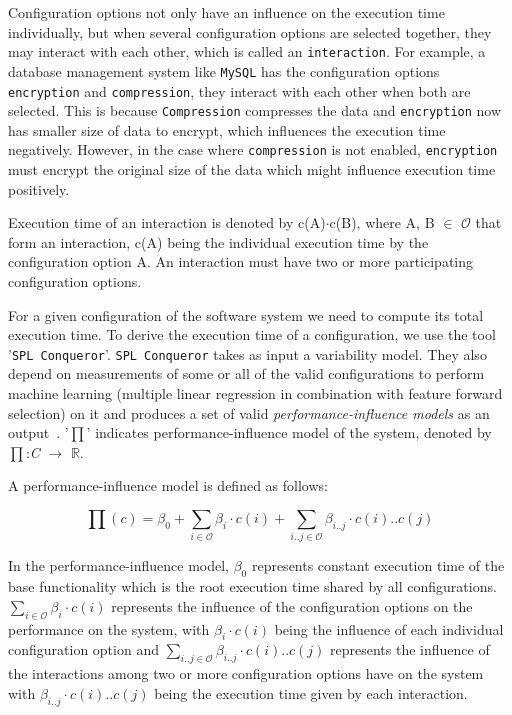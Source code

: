 Configuration options not only have an influence on the execution time individually, but when several configuration options are selected together, they may interact with each other, which is called an \texttt{interaction}. For example, a database management system like \texttt{MySQL} has the configuration options \texttt{encryption} and \texttt{compression}, they interact with each other when both are selected. This is because \texttt{Compression} compresses the data and \texttt{encryption} now has smaller size of data to encrypt, which influences the execution time negatively. However, in the case where \texttt{compression} is not enabled, \texttt{encryption} must encrypt the original size of the data which might influence execution time positively. 

Execution time of an interaction is denoted by c(A)$\cdot$c(B), where A, B $\in$ $\mathcal{O}$ that form an interaction, c(A) being the individual execution time by the configuration option A. An interaction must have two or more participating configuration options.

For a given configuration of the software system we need to compute its total execution time. To derive the execution time of a configuration, we use the tool '\texttt{SPL Conqueror}'. \texttt{SPL Conqueror} takes as input a variability model. They also depend on measurements of some or all of the valid configurations to perform machine learning (multiple linear regression in combination with feature forward selection) on it and produces a set of valid \textit{performance-influence models} as an output~\cite{DBLP:conf/sigsoft/SiegmundGAK15}. '$\mathcal\prod$' indicates performance-influence model of the system, denoted by $\mathcal\prod$:\textit{C} $\rightarrow$ $\mathbb{R}$. 

A performance-influence model is defined as follows:

\begin{equation*}
  \prod {(c)} =  \beta_{\mathrm{0}} + \sum_{i \in \mathcal{O}} \beta_{\textit{i}} \cdot {{c(i)}} + \sum_{i..j \in \mathcal{O}} \beta_{\textit{i..j}} \cdot c(i)..c(j)
  \tag{2.2.1}\label{eq:2.2.1} 
\end{equation*}

In the performance-influence model, $\beta_{\mathrm{0}}$ represents constant execution time of the base functionality which is the root execution time shared by all configurations. $\sum_{i \in \mathcal{O}} \beta_{\textit{i}}   \cdot {{c(i)}}$ represents the influence of the configuration options on the performance on the system, with  $\beta_{\textit{i}} \cdot {{c(i)}}$ being the influence of each individual configuration option and \sloppy $\sum_{i..j \in \mathcal{O}} \beta_{\textit{i..j}} \cdot c(i)..c(j)$ represents the influence of the interactions among two or more configuration options have on the system with $\beta_{\textit{i..j}} \cdot c(i)..c(j)$ being the execution time given by each interaction.

